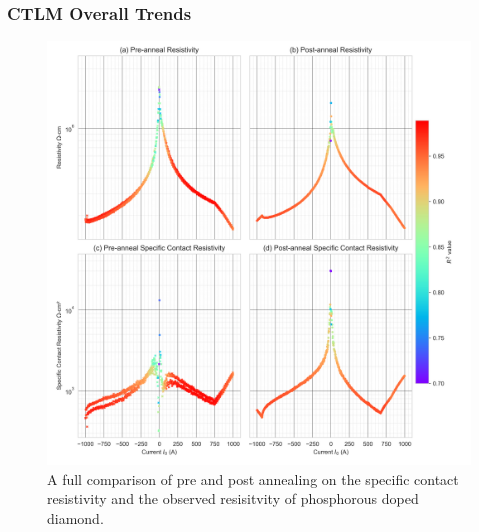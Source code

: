 \begin{refsection}
\subsubsection{CTLM Overall Trends}
\begin{figure}[H]
    \centering
    \includegraphics[width=\textwidth]{Chapter3/Figs/Raster/Sample F 2022/Comparison/ctlm_comparison_figure_chapter2.png}
    \caption{A full comparison of pre and post annealing on the specific contact resistivity and the observed resisitvity of phosphorous doped diamond.}
    \label{fig:comparison_full}
\end{figure}


\end{refsection}
